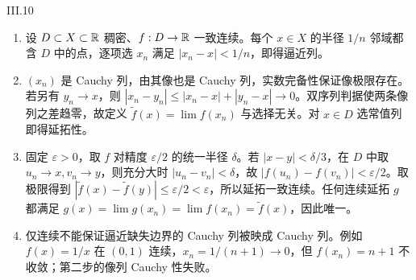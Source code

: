 \begin{solution}{III.10}
\begin{enumerate}
 \item 设 \(D\subset X\subset\mathbb{R}\) 稠密、\(f:D\to\mathbb{R}\) 一致连续。每个 \(x\in X\) 的半径 \(1/n\) 邻域都含 \(D\) 中的点，逐项选 \(x_n\) 满足 \(|x_n-x|<1/n\)，即得逼近列。
 \item \((x_n)\) 是 Cauchy 列，由其像也是 Cauchy 列，实数完备性保证像极限存在。若另有 \(y_n\to x\)，则 \(|x_n-y_n|\le|x_n-x|+|y_n-x|\to0\)。双序列判据使两条像列之差趋零，故定义 \(\widetilde f(x)=\lim f(x_n)\) 与选择无关。对 \(x\in D\) 选常值列即得延拓性。
 \item 固定 \(\varepsilon>0\)，取 \(f\) 对精度 \(\varepsilon/2\) 的统一半径 \(\delta\)。若 \(|x-y|<\delta/3\)，在 \(D\) 中取 \(u_n\to x,v_n\to y\)，则充分大时 \(|u_n-v_n|<\delta\)，故 \(|f(u_n)-f(v_n)|<\varepsilon/2\)。取极限得到 \(|\widetilde f(x)-\widetilde f(y)|\le\varepsilon/2<\varepsilon\)，所以延拓一致连续。任何连续延拓 \(g\) 都满足 \(g(x)=\lim g(x_n)=\lim f(x_n)=\widetilde f(x)\)，因此唯一。
 \item 仅连续不能保证逼近缺失边界的 Cauchy 列被映成 Cauchy 列。例如 \(f(x)=1/x\) 在 \((0,1)\) 连续，\(x_n=1/(n+1)\to0\)，但 \(f(x_n)=n+1\) 不收敛；第二步的像列 Cauchy 性失败。
\end{enumerate}
\end{solution}

